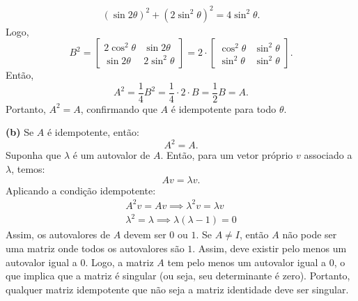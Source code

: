 \begin{resolution}
\begin{gather}
    (\sin 2\theta)^2 + (2\sin^2\theta)^2 = 4 \sin^2\theta.
  \end{gather}
  Logo,
  \begin{equation}
    B^2 = \begin{bmatrix}
      2\cos^2\theta & \sin 2\theta  \\
      \sin 2\theta  & 2\sin^2\theta
    \end{bmatrix} = 2 \cdot \begin{bmatrix}
      \cos^2\theta & \sin^2\theta \\
      \sin^2\theta & \sin^2\theta
    \end{bmatrix}.
  \end{equation}
  Então,
  \begin{equation}
    A^2 = \frac{1}{4} B^2 = \frac{1}{4} \cdot 2 \cdot B = \frac{1}{2} B = A.
  \end{equation}
  Portanto, \( A^2 = A \), confirmando que \( A \) é idempotente para todo \( \theta \).

    {\bf (b)} Se \( A \) é idempotente, então:
  \begin{equation}
    A^2 = A.
  \end{equation}
  Suponha que \( \lambda \) é um autovalor de \( A \). Então, para um vetor próprio \( v \) associado a \( \lambda \), temos:
  \begin{equation}
    A v = \lambda v.
  \end{equation}
  Aplicando a condição idempotente:
  \begin{gather}
    A^2 v = A v \implies \lambda^2 v = \lambda v \\
    \lambda^2 = \lambda \implies \lambda(\lambda - 1) = 0
  \end{gather}
  Assim, os autovalores de \( A \) devem ser \( 0 \) ou \( 1 \). Se \( A \neq I \), então \( A \) não pode ser uma matriz onde todos os autovalores são \( 1 \). Assim, deve existir pelo menos um autovalor igual a \( 0 \). Logo, a matriz \( A \) tem pelo menos um autovalor igual a \( 0 \), o que implica que a matriz é singular (ou seja, seu determinante é zero). Portanto, qualquer matriz idempotente que não seja a matriz identidade deve ser singular.
\end{resolution}